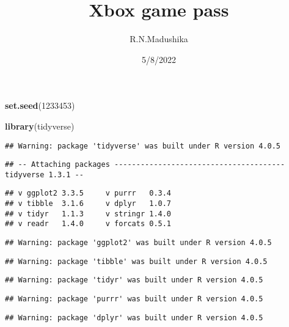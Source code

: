 \documentclass[
]{article}
\title{Xbox game pass}
\author{R.N.Madushika}
\date{5/8/2022}
\newenvironment{Shaded}{\begin{snugshade}}{\end{snugshade}}
\newcommand{\DecValTok}[1]{\textcolor[rgb]{0.00,0.00,0.81}{#1}}
\newcommand{\KeywordTok}[1]{\textcolor[rgb]{0.13,0.29,0.53}{\textbf{#1}}}
\newcommand{\NormalTok}[1]{#1}
\begin{document}
\maketitle

\begin{Shaded}
\begin{Highlighting}[]
\KeywordTok{set.seed}\NormalTok{(}\DecValTok{1233453}\NormalTok{)}
\end{Highlighting}
\end{Shaded}

\begin{Shaded}
\begin{Highlighting}[]
\KeywordTok{library}\NormalTok{(tidyverse)}
\end{Highlighting}
\end{Shaded}

\begin{verbatim}
## Warning: package 'tidyverse' was built under R version 4.0.5
\end{verbatim}

\begin{verbatim}
## -- Attaching packages --------------------------------------- tidyverse 1.3.1 --
\end{verbatim}

\begin{verbatim}
## v ggplot2 3.3.5     v purrr   0.3.4
## v tibble  3.1.6     v dplyr   1.0.7
## v tidyr   1.1.3     v stringr 1.4.0
## v readr   1.4.0     v forcats 0.5.1
\end{verbatim}

\begin{verbatim}
## Warning: package 'ggplot2' was built under R version 4.0.5
\end{verbatim}

\begin{verbatim}
## Warning: package 'tibble' was built under R version 4.0.5
\end{verbatim}

\begin{verbatim}
## Warning: package 'tidyr' was built under R version 4.0.5
\end{verbatim}

\begin{verbatim}
## Warning: package 'purrr' was built under R version 4.0.5
\end{verbatim}

\begin{verbatim}
## Warning: package 'dplyr' was built under R version 4.0.5
\end{verbatim}
\end{document}
